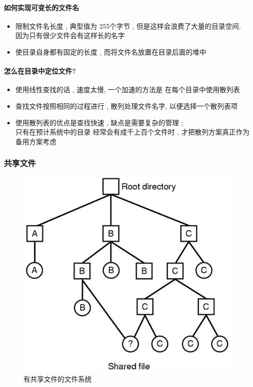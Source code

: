 \documentclass[UTF8,a4paper]{ctexart}
\begin{document}
\paragraph{如何实现可变长的文件名}
\begin{itemize}
	\item 限制文件名长度  , 典型值为 255个字节 , 但是这样会浪费了大量的目录空间, 因为只有很少文件会有这样长的名字
	\item 使目录自身都有固定的长度 , 而将文件名放置在目录后面的堆中
\end{itemize}

\paragraph{怎么在目录中定位文件?}
\begin{itemize}
	\item 使用线性查找的话 , 速度太慢, 一个加速的方法是 在每个目录中使用散列表
	\item 查找文件按照相同的过程进行 , 散列处理文件名字, 以便选择一个散列表项
	\item 使用散列表的优点是查找快速 , 缺点是需要复杂的管理 ;\\
	      只有在预计系统中的目录 经常会有成千上百个文件时 , 才把散列方案真正作为备用方案考虑
\end{itemize}

\subsubsection{共享文件}
\begin{figure}[H]
	\centering
	\includegraphics[scale = 0.5]{assets/ModernOperatingSystems/2018-01-08-16-34-09.png}
	\caption{有共享文件的文件系统}
\end{figure}
\end{document}
